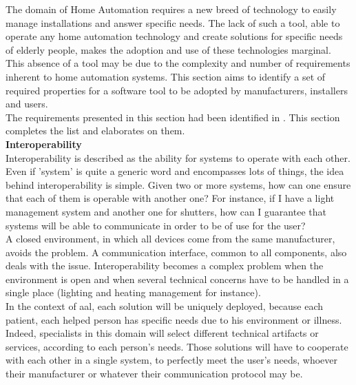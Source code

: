 The domain of Home Automation requires a new breed of technology to easily manage installations and answer specific needs. The lack of such a tool, able to operate any home automation technology and create solutions for specific needs of elderly people, makes the adoption and use of these technologies marginal. This absence of a tool may be due to the complexity and number of requirements inherent to home automation systems. This section aims to identify a set of required properties for a software tool to be adopted by manufacturers, installers and users.\\

The requirements presented in this section had been identified in \cite{Nain09a}. This section completes the list and elaborates on them.\\



{\bf Interoperability}\\
Interoperability is described as the ability for systems to operate with each other. Even if 'system' is quite a generic word and encompasses lots of things, the idea behind interoperability is simple. Given two or more systems, how can one ensure that each of them is operable with another one? For instance, if I have a light management system and another one for shutters, how can I guarantee that systems will be able to communicate in order to be of use for the user?\\
A closed environment, in which all devices come from the same manufacturer, avoids the problem. A communication interface, common to all components, also deals with the issue.
Interoperability becomes a complex problem when the environment is open and when several technical concerns have to be handled in a single place (lighting and heating management for instance).\\
In the context of \gls{aal}, each solution will be uniquely deployed, because each patient, each helped person has specific needs due to his environment or illness. Indeed, specialists in this domain will select different technical artifacts or services, according to each person's needs. Those solutions will have to cooperate with each other in a single system, to perfectly meet the user's needs, whoever their manufacturer or whatever their communication protocol may be.\\


